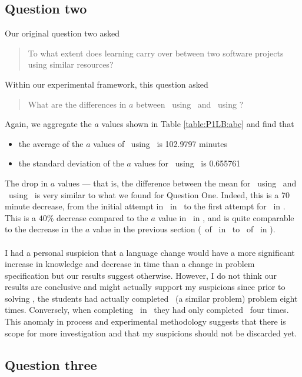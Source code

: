 \subsection{Question two}

Our original question two asked
\begin{quote}
  To what extent does learning carry over between two software projects using
  similar resources?
\end{quote}

Within our experimental framework, this question asked
\begin{quote}
   What are the differences in $a$ between \PO\ using \LA\ and \PO\ using
  \LB?
\end{quote}

Again, we aggregate the $a$ values shown in Table \ref{table:P1LB:abc} and find
that
\begin{itemize}
  \item the average of the $a$ values of \PO\ using \LB\ is 102.9797 minutes
  \item the standard deviation of the $a$ values for \PO\ using \LB\ is 0.655761
\end{itemize}

The drop in $a$ values --- that is, the difference between the mean for \PO\
using \LA\ and \PO\ using \LB\ is very similar to what we found for Question
One.
Indeed, this is a 70 minute decrease, from the initial attempt in \PO\ in \LA\
to the first attempt for \PO\ in \LB.
This is a $40\%$ decrease compared to the $a$ value in \PO\ in \LA, and is quite
comparable to the decrease in the $a$ value in the previous section (\AZ\ of
\PO\ in \LA\ to \AZ\ of \PT\ in \LA).\\
\\
I had a personal suspicion that a language change would have a more significant
increase in knowledge and decrease in time than a change in problem
specification but our results suggest otherwise.
However, I do not think our results are conclusive and might actually support my
suspicions since prior to solving \PT, the students had actually completed \PO\
(a similar problem) problem eight times.
Conversely, when completing \PO\ in \LB\ they had only completed \PO\ four times.
This anomaly in process and experimental methodology suggests that
there is scope for more investigation and that my suspicions should not be
discarded yet.

\subsection{Question three}

